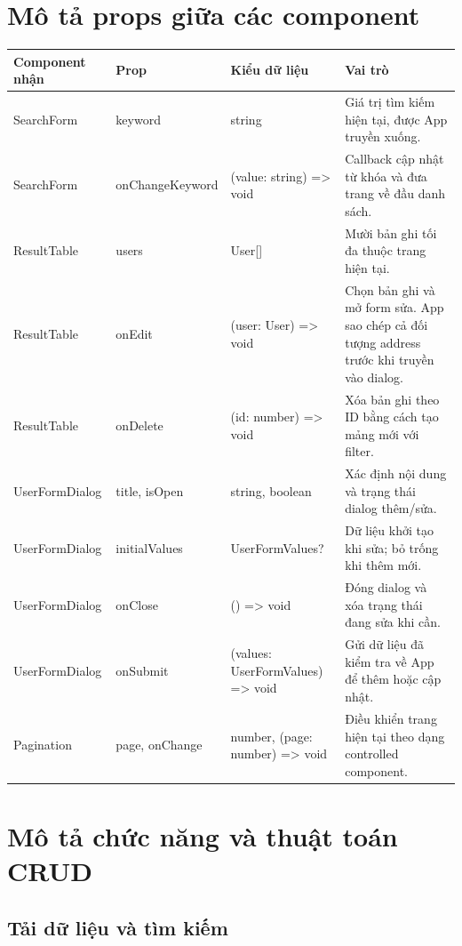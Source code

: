 \documentclass[12pt,a4paper]{article}
\newcommand{\code}[1]{\textsf{\small #1}}
\begin{document}
\section{Mô tả props giữa các component}

\begin{tabularx}{\textwidth}{@{}L{3.1cm} L{3.5cm} L{3.4cm} Y@{}}
\toprule
\textbf{Component nhận} & \textbf{Prop} & \textbf{Kiểu dữ liệu} & \textbf{Vai trò} \\
\midrule
\code{SearchForm} & \code{keyword} & \code{string} & Giá trị tìm kiếm hiện tại, được \code{App} truyền xuống. \\
\code{SearchForm} & \code{onChangeKeyword} & \code{(value: string) => void} & Callback cập nhật từ khóa và đưa trang về đầu danh sách. \\
\code{ResultTable} & \code{users} & \code{User[]} & Mười bản ghi tối đa thuộc trang hiện tại. \\
\code{ResultTable} & \code{onEdit} & \code{(user: User) => void} & Chọn bản ghi và mở form sửa. \code{App} sao chép cả đối tượng \code{address} trước khi truyền vào dialog. \\
\code{ResultTable} & \code{onDelete} & \code{(id: number) => void} & Xóa bản ghi theo ID bằng cách tạo mảng mới với \code{filter}. \\
\code{UserFormDialog} & \code{title}, \code{isOpen} & \code{string}, \code{boolean} & Xác định nội dung và trạng thái dialog thêm/sửa. \\
\code{UserFormDialog} & \code{initialValues} & \code{UserFormValues?} & Dữ liệu khởi tạo khi sửa; bỏ trống khi thêm mới. \\
\code{UserFormDialog} & \code{onClose} & \code{() => void} & Đóng dialog và xóa trạng thái đang sửa khi cần. \\
\code{UserFormDialog} & \code{onSubmit} & \code{(values: UserFormValues) => void} & Gửi dữ liệu đã kiểm tra về \code{App} để thêm hoặc cập nhật. \\
\code{Pagination} & \code{page}, \code{onChange} & \code{number}, \code{(page: number) => void} & Điều khiển trang hiện tại theo dạng controlled component. \\
\bottomrule
\end{tabularx}

\section{Mô tả chức năng và thuật toán CRUD}

\subsection{Tải dữ liệu và tìm kiếm}
\end{document}
